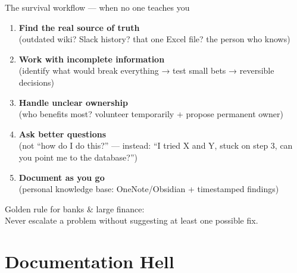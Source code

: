 \documentclass[aspectratio=169, 11pt]{beamer}
\begin{document}
	\begin{frame}{The survival workflow — when no one teaches you}
		\begin{enumerate}
			\item \textbf{Find the real source of truth} \\
			\small(outdated wiki? Slack history? that one Excel file? the person who knows)
			
			\item \textbf{Work with incomplete information} \\
			\small(identify what would break everything → test small bets → reversible decisions)
			
			\item \textbf{Handle unclear ownership} \\
			\small(who benefits most? volunteer temporarily + propose permanent owner)
			
			\item \textbf{Ask better questions} \\
			\small(not “how do I do this?” — instead: “I tried X and Y, stuck on step 3, can you point me to the database?”)
			
			\item \textbf{Document as you go} \\
			\small(personal knowledge base: OneNote/Obsidian + timestamped findings)
		\end{enumerate}
		\vspace{0.2cm}
		\alert{Golden rule for banks \& large finance:} \\
		Never escalate a problem without suggesting at least one possible fix.
	\end{frame}
	
	
	
	\section{Documentation Hell}
	
\end{document}
